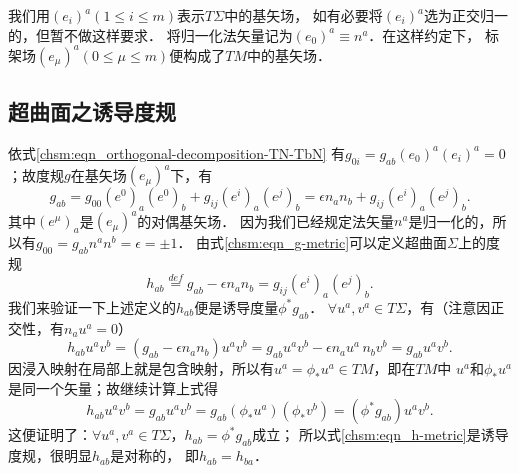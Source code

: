 我们用$(e_i)^a (1\leqslant i \leqslant m)$表示$T\Sigma$中的基矢场，
如有必要将$(e_i)^a$选为正交归一的，但暂不做这样要求．
将归一化法矢量记为$(e_0)^a\equiv {n}^a$．在这样约定下，
标架场$(e_\mu)^a (0\leqslant \mu \leqslant m)$便构成了$TM$中的基矢场．




\subsection{超曲面之诱导度规}
依式\eqref{chsm:eqn_orthogonal-decomposition-TN-TbN}
有$g_{0i}={g}_{ab}(e_0)^a (e_i)^a=0$；故度规$g$在基矢场$(e_\mu)^a$下，有
\begin{equation}\label{chsm:eqn_g-metric}
    g_{ab}= g_{00} (e^0)_a(e^0)_b + g_{ij} (e^i)_a(e^j)_b
    = \epsilon n_a n_b + g_{ij} (e^i)_a(e^j)_b.
\end{equation}
其中$(e^\mu)_a$是$(e_\mu)^a$的对偶基矢场．
因为我们已经规定法矢量${n}^a$是归一化的，所以有$g_{00}={g}_{ab}{n}^a {n}^b=\epsilon=\pm 1$．
由式\eqref{chsm:eqn_g-metric}可以定义超曲面$\Sigma$上的度规
\begin{equation}\label{chsm:eqn_h-metric}
    h_{ab} \overset{def}{=} g_{ab}- \epsilon {n}_a {n}_b = g_{ij} (e^i)_a(e^j)_b.
\end{equation}
我们来验证一下上述定义的$h_{ab}$便是诱导度量$\phi^* g_{ab}$．
$\forall u^a, v^a \in T\Sigma$，有（注意因正交性，有${n}_au^a=0$）
\begin{equation}
    h_{ab}u^a v^b = (g_{ab}-\epsilon{n}_a {n}_b)u^a v^b
      =  g_{ab}u^a v^b -\epsilon {n}_au^a \, {n}_b v^b = g_{ab}u^a v^b .
\end{equation}
因浸入映射在局部上就是包含映射，所以有$u^a=\phi_{*}u^a\in TM$，即在$TM$中
$u^a$和$\phi_{*}u^a$是同一个矢量；故继续计算上式得
\begin{equation}
    h_{ab}u^a v^b =g_{ab}u^a v^b = g_{ab}(\phi_{*}u^a) (\phi_{*}v^b)=(\phi^{*}g_{ab})u^a v^b.
\end{equation}
这便证明了：$\forall u^a, v^a \in T\Sigma$，$h_{ab}=\phi^* g_{ab}$成立；
所以式\eqref{chsm:eqn_h-metric}是诱导度规，很明显$h_{ab}$是对称的，
即$h_{ab}=h_{ba}$．

